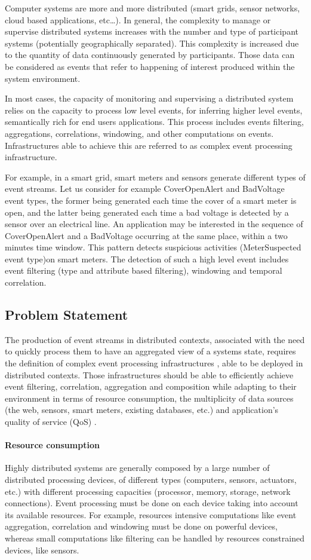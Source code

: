 \documentclass[a4paper,twoside]{article}
\begin{document}
Computer systems are more and more distributed (smart grids, sensor networks, cloud based applications, etc…). In general, the complexity to manage or supervise distributed systems increases with the number and type of participant systems (potentially geographically separated). This complexity is increased due to the quantity of data continuously generated by participants. Those data can be considered as events that refer to happening of interest produced within the system environment. 

In most cases, the capacity of monitoring and supervising a distributed system relies on the capacity to process low level events, for inferring higher level events, semantically rich for end users applications. This process includes events filtering, aggregations, correlations, windowing, and other computations on events. Infrastructures able to achieve this are referred to as complex event processing infrastructure. 

For example, in a smart grid, smart meters and sensors generate different types of event streams. Let us consider for example CoverOpenAlert and BadVoltage event types, the former being generated each time the cover of a smart meter is open, and the latter being generated each time a bad voltage is detected by a sensor over an electrical line. An application may be interested in the sequence of CoverOpenAlert and a BadVoltage occurring at the same place, within a two minutes time window. This pattern detects suspicious activities (MeterSuspected event type)on smart meters.  The detection of such a high level event includes event filtering (type and attribute based filtering), windowing and temporal correlation.
\subsection{Problem Statement}
The production of event streams in distributed contexts, associated with the need to quickly process them to have an aggregated view of a systems state, requires the definition of complex event processing infrastructures \cite{Esper,Streambase,Cugola2009,Gyllstrom2006,Oracle}, able to be deployed in distributed contexts. Those infrastructures should be able to efficiently achieve event filtering, correlation, aggregation and composition while adapting to their environment in terms of resource consumption, the multiplicity of data sources (the web, sensors, smart meters, existing databases, etc.) and application’s quality of service (QoS) \cite{Appel2010}.
\paragraph{Resource consumption}
Highly distributed systems are generally composed by a large number of distributed processing devices, of different types (computers, sensors, actuators, etc.) with different processing capacities (processor, memory, storage, network connections). Event processing must be done on each device taking into account its available resources. For example, resources intensive computations like event aggregation, correlation and windowing must be done on powerful devices, whereas small computations like filtering can be handled by resources constrained devices, like sensors.
\end{document}
